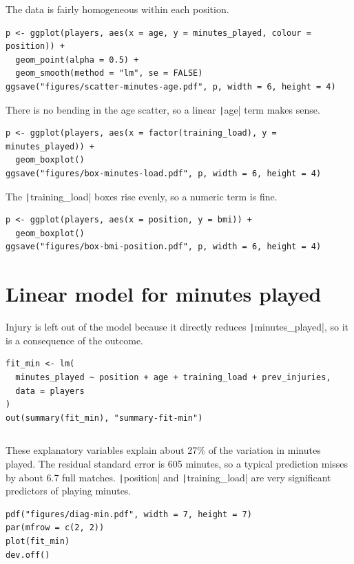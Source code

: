 \documentclass[12pt,notitlepage]{report}
\begin{document}
The data is fairly homogeneous within each position.

\begin{verbatim}
p <- ggplot(players, aes(x = age, y = minutes_played, colour = position)) +
  geom_point(alpha = 0.5) +
  geom_smooth(method = "lm", se = FALSE)
ggsave("figures/scatter-minutes-age.pdf", p, width = 6, height = 4)
\end{verbatim}


There is no bending in the age scatter, so a linear \texttt|age| term
makes sense.

\begin{verbatim}
p <- ggplot(players, aes(x = factor(training_load), y = minutes_played)) +
  geom_boxplot()
ggsave("figures/box-minutes-load.pdf", p, width = 6, height = 4)
\end{verbatim}


The \texttt|training_load| boxes rise evenly, so a numeric term is fine.

\begin{verbatim}
p <- ggplot(players, aes(x = position, y = bmi)) +
  geom_boxplot()
ggsave("figures/box-bmi-position.pdf", p, width = 6, height = 4)
\end{verbatim}


\section{Linear model for minutes played}

Injury is left out of the model because it directly reduces
\texttt|minutes_played|, so it is a consequence of the outcome.

\begin{verbatim}
fit_min <- lm(
  minutes_played ~ position + age + training_load + prev_injuries,
  data = players
)
out(summary(fit_min), "summary-fit-min")
\end{verbatim}

\inputminted{text}{output/summary-fit-min.txt}

These explanatory variables explain about 27\% of the variation in minutes
played. The residual standard error is 605 minutes, so a typical prediction
misses by about 6.7 full matches. \texttt|position| and
\texttt|training_load| are very significant predictors of playing
minutes.

\begin{verbatim}
pdf("figures/diag-min.pdf", width = 7, height = 7)
par(mfrow = c(2, 2))
plot(fit_min)
dev.off()
\end{verbatim}

\end{document}
